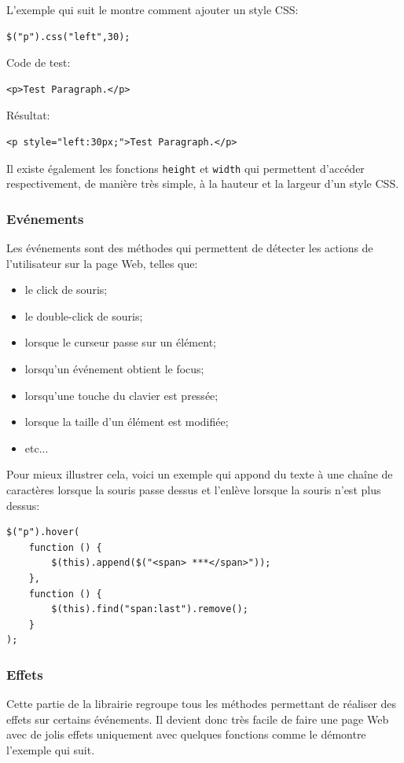 \documentclass[10pt,a4paper,titlepage]{article}
\begin{document}
L'exemple qui suit le montre comment ajouter un style CSS:
\begin{lstlisting}
$("p").css("left",30);
\end{lstlisting}

Code de test:
\begin{lstlisting}
<p>Test Paragraph.</p>
\end{lstlisting}

Résultat:
\begin{lstlisting}
<p style="left:30px;">Test Paragraph.</p>
\end{lstlisting}

Il existe également les fonctions \texttt{height} et \texttt{width} qui permettent d'accéder respectivement, de manière très simple,  à la hauteur et la largeur d'un style CSS.

\subsubsection{Evénements}
Les événements sont des méthodes qui permettent de détecter les actions de l'utilisateur sur la page Web, telles que:
\begin{itemize}
	\item {le click de souris;}
	\item {le double-click de souris;}
	\item {lorsque le curseur passe sur un élément;}
	\item {lorsqu'un événement obtient le focus;}
	\item {lorsqu'une touche du clavier est pressée;}
	\item {lorsque la taille d'un élément est modifiée;}
	\item {etc...\\}
\end{itemize}

Pour mieux illustrer cela, voici un exemple qui appond du texte à une chaîne de caractères lorsque la souris passe dessus et l'enlève lorsque la souris n'est plus dessus:

\begin{lstlisting}
$("p").hover(
	function () {
		$(this).append($("<span> ***</span>"));
	}, 
	function () {
		$(this).find("span:last").remove();
	}
);
\end{lstlisting}


\subsubsection{Effets}
Cette partie de la librairie regroupe tous les méthodes permettant de réaliser des effets sur certains événements. Il devient donc très facile de faire une page Web avec de jolis effets uniquement avec quelques fonctions comme le démontre l'exemple qui suit.
\end{document}
